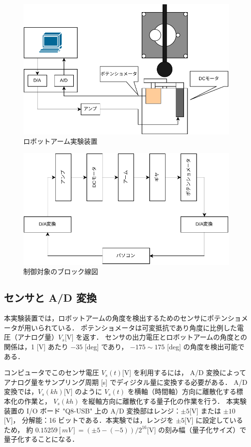 \begin{figure}[h]
  \centering
  \includegraphics[scale=0.4]{sozai/1.pdf}
  \caption{ロボットアーム実験装置}
\end{figure}

\begin{figure}[h]
  \centering
  \includegraphics[scale=0.65]{sozai/2.pdf}
  \caption{制御対象のブロック線図}
\end{figure}

\subsection{センサと A/D 変換}

本実験装置では，ロボットアームの角度を検出するためのセンサにポテンショメータが用いられている．
ポテンショメータは可変抵抗であり角度に比例した電圧（アナログ量）\(V_s \)[V] を返す．
センサの出力電圧とロボットアームの角度との関係は，1 [V] あたり \(-35\) [deg] であり，
\(-175 \sim 175\) [deg] の角度を検出可能である．

コンピュータでこのセンサ電圧 \(V_s(t) \)[V] を利用するには，
A/D 変換によってアナログ量をサンプリング周期 [s] でディジタル量に変換する必要がある．
A/D 変換では，\(V_s(kh) \)[V] のように \(V_s(t)\) を横軸（時間軸）方向に離散化する標本化の作業と，
\(V_s(kh)\) を縦軸方向に離散化する量子化の作業を行う．
本実験装置の I/O ボード "Q8-USB" 上の A/D 変換部はレンジ：\(\pm 5 \)[V] または \(\pm 10 \)[V]，
分解能：16 ビットである．本実験では，レンジを \(\pm 5 \)[V] に設定しているため，
約 \(0.15259 [mV] = (\pm 5 - (-5))/2^{16} \)[V] の刻み幅（量子化サイズ）で量子化することになる．

